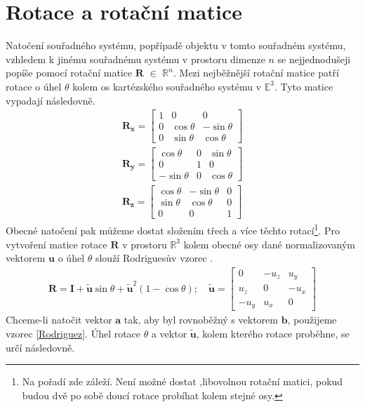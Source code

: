 \documentclass[twoside]{ctuthesis}
\newcommand{\spc}[2]{$\mathbb{#1}^{#2}$}
\newcommand{\tl}[1]{$\mathbf{#1}$}
\begin{document}
\section{Rotace a rotační matice}
Natočení souřadného systému, popřípadě objektu v tomto souřadném systému, vzhledem k jinému souřadnému systému v prostoru dimenze $n$ se nejjednodušeji popíše pomocí rotační matice \tl{R} $\in$ \spc{R}{n}. Mezi nejběžnější rotační matice patří rotace o úhel $\theta$ kolem os kartézského souřadného systému v \spc{E}{3}. Tyto matice vypadají následovně.
\begin{align}
    \mathbf{R_x}=\begin{bmatrix} 1 &  0 & 0 \\ 0 & \cos \theta & -\sin \theta \\ 0 & \sin \theta & \cos \theta \end{bmatrix} \\
    \mathbf{R_y}=\begin{bmatrix} \cos \theta & 0 & \sin \theta \\ 0 & 1 & 0 \\ -\sin \theta & 0 & \cos \theta \end{bmatrix} \\
    \mathbf{R_z}=\begin{bmatrix} \cos \theta & -\sin \theta & 0 \\ \sin \theta & \cos \theta & 0 \\ 0 & 0 & 1 \end{bmatrix}
\end{align}
Obecné natočení pak můžeme dostat složením třech a více těchto rotací\footnote{Na pořadí zde záleží. Není možné dostat ,libovolnou rotační matici, pokud budou dvě po sobě doucí rotace probíhat kolem stejné osy.}.
Pro vytvoření matice rotace \tl{R} v prostoru \spc{R}{3} kolem obecné osy dané normalizovaným vektorem \tl{u} o úhel $\theta$ slouží Rodriguesův vzorec \cite{RodriguesRotationFormula}.
\begin{align}
    \mathbf{R} = \mathbf{I} + \tilde{\mathbf{u}}\sin \theta + \tilde{\mathbf{u}}^2(1 - \cos \theta); \quad \tilde{\mathbf{u}} = \begin{bmatrix} 0 & -u_{z} & u_{y} \\ u_z & 0 & -u_x \\ -u_y & u_x & 0 \end{bmatrix}
    \label{Rodriguez}
\end{align}
Chceme-li natočit vektor \tl{a} tak, aby byl rovnoběžný s vektorem \tl{b}, použijeme vzorec \ref{Rodriguez}. Úhel rotace $\theta$ a vektor $\tilde{\mathbf{u}}$, kolem kterého rotace proběhne, se určí následovně.
\end{document}
